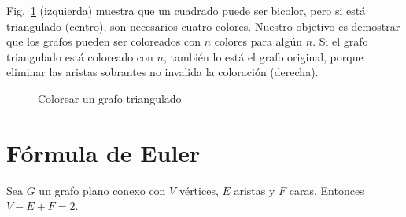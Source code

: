 \begin{example}
Fig.~\ref{f.five-triangular-graph} (izquierda) muestra que un cuadrado puede ser bicolor, pero si está triangulado (centro), son necesarios cuatro colores. Nuestro objetivo es demostrar que los grafos pueden ser coloreados con $n$ colores para algún $n$. Si el grafo triangulado está coloreado con $n$, también lo está el grafo original, porque eliminar las aristas sobrantes no invalida la coloración (derecha).
\end{example}

\begin{figure}[b]
\begin{center}
\end{center}
\caption{Colorear un grafo triangulado}\label{f.five-triangular-graph}
\end{figure}


\section{Fórmula de Euler}\label{s.euler}

\begin{theorem}\label{thm.euler} Sea $G$ un grafo plano conexo con $V$ vértices, $E$ aristas y $F$ caras. Entonces $V-E+F=2$.
\end{theorem}

